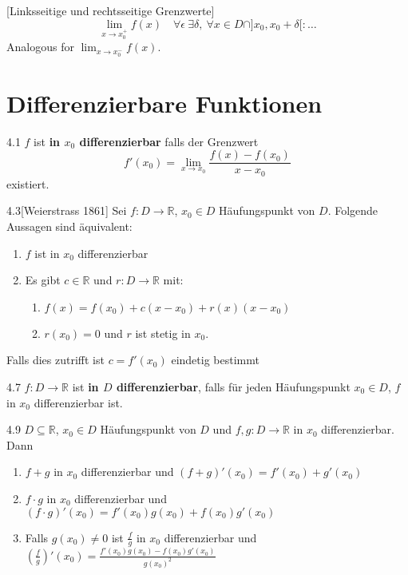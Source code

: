 \documentclass[8pt,a4paper,twocolumn,table]{extarticle}
\newcommand{\R}{\mathbb{R}}
\begin{document}
\begin{definition}{}[Linksseitige und rechtsseitige Grenzwerte]
    \[ \lim_{x \to x_0^+} f(x) \quad \forall \epsilon\ \exists \delta,\ \forall x \in D \cap ]x_0, x_0 + \delta[: \dots \]
    Analogous for $\lim_{x \to x_0^-} f(x)$.
\end{definition}

\section{Differenzierbare Funktionen}

\begin{definition}{4.1}
    $f$ ist \textbf{in $x_0$ differenzierbar} falls der Grenzwert
    \[ f'(x_0) = \lim_{x \to x_0} \frac{f(x) - f(x_0)}{x - x_0} \]
    existiert.
\end{definition}

\begin{satz}{4.3}[Weierstrass 1861]
    Sei $f: D \to \R$, $x_0 \in D$ Häufungspunkt von $D$. Folgende Aussagen sind äquivalent:
    \begin{enumerate}
        \item $f$ ist in $x_0$ differenzierbar
        \item Es gibt $c \in \R$ und $r: D \to \R$ mit:
              \begin{enumerate}
                  \item $f(x) = f(x_0) + c(x - x_0) + r(x)(x - x_0)$
                  \item $r(x_0) = 0$ und $r$ ist stetig in $x_0$.
              \end{enumerate}
    \end{enumerate}

    Falls dies zutrifft ist $c = f'(x_0)$ eindetig bestimmt
\end{satz}

\begin{satz}{4.7}
    $f: D \to \R$ ist \textbf{in $D$ differenzierbar}, falls für jeden Häufungspunkt $x_0 \in D$, $f$ in $x_0$ differenzierbar ist.
\end{satz}

\begin{satz}{4.9}
    $D \subseteq \R$, $x_0 \in D$ Häufungspunkt von $D$ und $f,g: D \to \R$ in $x_0$ differenzierbar.
    Dann
    \begin{enumerate}
        \item $f+g$ in $x_0$ differenzierbar und $(f + g)'(x_0) = f'(x_0) + g'(x_0)$
        \item $f \cdot g$ in $x_0$ differenzierbar und $(f \cdot g)'(x_0) = f'(x_0)g(x_0) + f(x_0)g'(x_0)$
        \item Falls $g(x_0) \ne 0$ ist $\frac{f}{g}$ in $x_0$ differenzierbar und
              $\left( \frac{f}{g} \right)'(x_0) = \frac{f'(x_0)g(x_0) - f(x_0)g'(x_0)}{g(x_0)^2}$
    \end{enumerate}
\end{satz}
\end{document}
